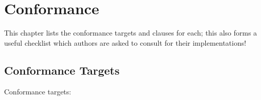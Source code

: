 \chapter{Conformance}\label{sec:Conformance}

This chapter lists the conformance targets and clauses for each; this
also forms a useful checklist which authors are asked to consult for their
implementations!

\section{Conformance Targets}\label{sec:Conformance / Conformance Targets}

Conformance targets:

